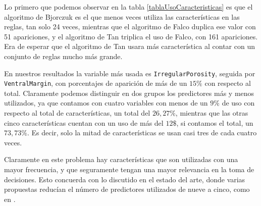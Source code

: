 Lo primero que podemos observar en la tabla \ref{tablaUsoCaracteristicas} es que el algoritmo de Bjorczuk es el que menos veces utiliza las características en las reglas, tan solo 24 veces, mientras que el algoritmo de Falco duplica ese valor con 51 apariciones, y el algoritmo de Tan triplica el uso de Falco, con 161 apariciones. Era de esperar que el algoritmo de Tan usara más característica al contar con un conjunto de reglas mucho más grande.

En nuestros resultados la variable más usada es \texttt{IrregularPorosity}, seguida por \texttt{VentralMargin}, con porcentajes de aparición de más de un $15\%$ con respecto al total. Claramente podemos distinguir en dos grupos los predictores más y menos utilizados, ya que contamos con cuatro variables con menos de un $9\%$ de uso con respecto al total de características, un total del $26,27\%$, mientras que las otras cinco características cuentan con un uso de más del $12\$$, si contamos el total, un $73,73\%$. Es decir, solo la mitad de características se usan casi tres de cada cuatro veces.

Claramente en este problema hay características que son utilizadas con una mayor frecuencia, y que seguramente tengan una mayor relevancia en la toma de decisiones. Esto concuerda con lo discutido en el estado del arte, donde varias propuestas reducían el número de predictores utilizados de nueve a cinco, como en \cite{componentBased}.



\newpage
